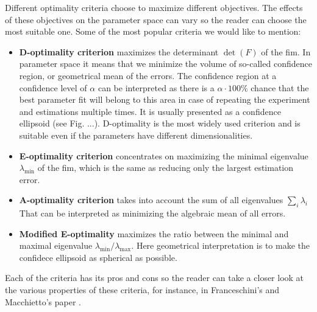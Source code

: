 \documentclass[10pt,A4paper]{article}
\begin{document}
Different optimality criteria choose to maximize different objectives.
The effects of these objectives on the parameter space can vary so the reader can choose the most suitable one. 
Some of the most popular criteria we would like to mention:
\begin{itemize}
    \item \textbf{D-optimality criterion} maximizes the determinant $\det (F)$ of the \ac{fim}. 
    In parameter space it means that we minimize the volume of so-called confidence region, or geometrical mean of the errors.
    The confidence region at a confidence level of $\alpha$ can be interpreted as there is a $\alpha \cdot 100 \%$ chance that the best parameter fit will belong to this area in case of repeating the experiment and estimations multiple times.
    It is usually presented as a confidence ellipsoid (see Fig. ...).
    D-optimality is the most widely used criterion and is suitable even if the parameters have different dimensionalities.
    
    \item \textbf{E-optimality criterion} concentrates on maximizing the minimal eigenvalue $\lambda_{\min}$ of the \ac{fim}, which is the same as reducing only the largest estimation error.
    
    \item \textbf{A-optimality criterion} takes into account the sum of all eigenvalues $\sum_i \lambda_i$
    That can be interpreted as minimizing the algebraic mean of all errors.
    
    \item \textbf{Modified E-optimality} maximizes the ratio between the minimal and maximal eigenvalue $\lambda_{\min} / \lambda_{\max}$.
    Here geometrical interpretation is  to make the confidece ellipsoid as spherical as possible.
    
\end{itemize}
Each of the criteria has its pros and cons so the reader can take a closer look at the various properties of these criteria, for instance, in Franceschini's and Macchietto's paper \cite{franceschiniModelbasedDesignExperiments2008}.

\end{document}
